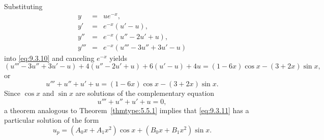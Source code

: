 \begin{examplesolution}
\solution Substituting
\begin{eqnarray*}
  y    & = & ue^{-x},           \\
  y'   & = & e^{-x}(u'-u),      \\
  y''  & = & e^{-x}(u''-2u'+u), \\
  y''' & = & e^{-x}(u'''-3u''+3u'-u)
\end{eqnarray*}
into \eqref{eq:9.3.10} and canceling $e^{-x}$ yields
\[
  (u'''-3u''+3u'-u)+4(u''-2u'+u)+6(u'-u)+4u =(1-6x)\cos x-(3+2x)\sin x,
\]
or
\begin{equation}
  \label{eq:9.3.11}u'''+u''+u'+u=(1-6x)\cos x-(3+2x)\sin x.
\end{equation}
Since $\cos x$ and $\sin x$ are solutions of the complementary equation
\[
  u'''+u''+u'+u=0,
\]
a theorem analogous to Theorem~\ref{thmtype:5.5.1} implies that \eqref{eq:9.3.11} has a particular
solution of the form
\begin{equation}
  \label{eq:9.3.12}u_{p}=(A_{0}x+A_{1}x^{2})\cos x+(B_{0}x+B_{1}x^{2})\sin x.
\end{equation}


\end{examplesolution}
